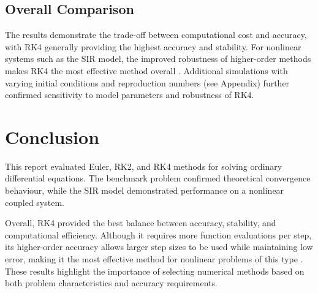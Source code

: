 \documentclass{article}
\begin{document}
\subsection{Overall Comparison}
The results demonstrate the trade-off between computational cost and accuracy, with RK4 generally providing the highest accuracy and stability.
For nonlinear systems such as the SIR model, the improved robustness of higher-order methods makes RK4 the most effective method overall \cite{19}.
Additional simulations with varying initial conditions and reproduction numbers (see Appendix) further confirmed sensitivity to model parameters and robustness of RK4.

\section{Conclusion}

This report evaluated Euler, RK2, and RK4 methods for solving ordinary differential equations. The benchmark problem confirmed theoretical convergence behaviour, while the SIR model demonstrated performance on a nonlinear coupled system.

Overall, RK4 provided the best balance between accuracy, stability, and computational efficiency. Although it requires more function evaluations per step, its higher-order accuracy allows larger step sizes to be used while maintaining low error, making it the most effective method for nonlinear problems of this type \cite{1}. These results highlight the importance of selecting numerical methods based on both problem characteristics and accuracy requirements.

\newpage{}
\end{document}
